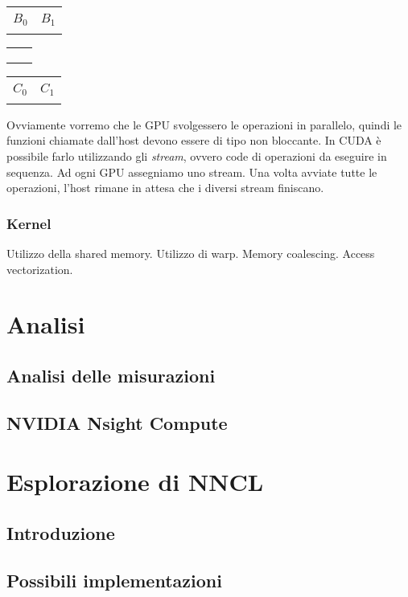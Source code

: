 \documentclass[a4paper]{article}
\begin{document}
\begin{table}[h]
    \begin{tabular}{|c|c|}
        \hline
              &       \\
        $B_0$ & $B_1$ \\
              &       \\ \hline
    \end{tabular}

    \begin{tabular}{|c|c|}
        \hline
         & \\
         & \\
         & \\ \hline
    \end{tabular}
    \begin{tabular}{|c|c|}
        \hline
              &       \\
        $C_0$ & $C_1$ \\
              &       \\ \hline
    \end{tabular}
\end{table}

Ovviamente vorremo che le GPU svolgessero le operazioni in parallelo, quindi le funzioni chiamate dall'host devono essere di tipo non bloccante. In CUDA è possibile farlo utilizzando gli \textit{stream}, ovvero code di operazioni da eseguire in sequenza. Ad ogni GPU assegniamo uno stream.
Una volta avviate tutte le operazioni, l'host rimane in attesa che i diversi stream finiscano.

\subsubsection{Kernel}
Utilizzo della shared memory. Utilizzo di warp. Memory coalescing. Access vectorization.

\section{Analisi}

\subsection{Analisi delle misurazioni}

\subsection{NVIDIA Nsight Compute}

\section{Esplorazione di NNCL}

\subsection{Introduzione}

\subsection{Possibili implementazioni}

\printbibliography
\end{document}
